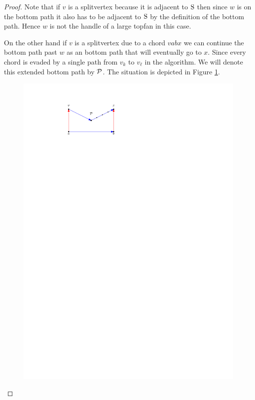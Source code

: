     \begin{proof}
      Note that if $v$ is a splitvertex because it is adjacent to $\pS$ then since $w$ is on the bottom path it also has to be adjacent to $\pS$ by the definition of the bottom path.
      Hence $w$ is not the handle of a large topfan in this case.

      On the other hand if $v$ is a splitvertex due to a chord $v a b x$ we can continue the bottom path past $w$ as an bottom path that will eventually go to $x$.
      Since every chord is evaded by a single path from $v_k$ to $v_\ell$ in the algorithm.
      We will denote this extended bottom path by $\P$.
      The situation is depicted in Figure \ref{fig:sweep:botomPathChord}.

      \begin{figure}[h]
        \centering
        \includegraphics[scale=1]{unifiedAlgo/img/sweep/bottompathChord.pdf}
        \caption{}
        \label{fig:sweep:botomPathChord}
      \end{figure}


\end{proof}
